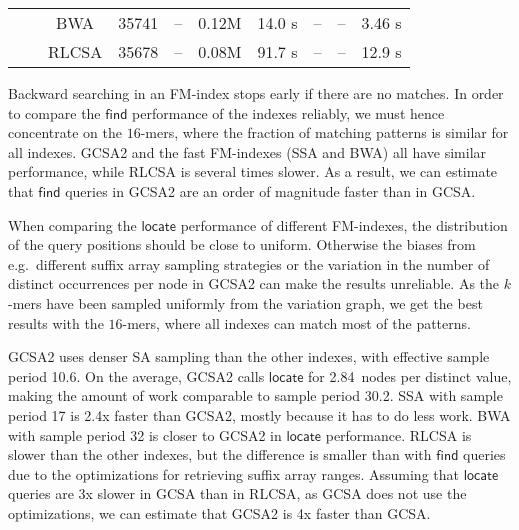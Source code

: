 \documentclass[twoside,leqno,twocolumn]{article}
\newcommand{\find}{\ensuremath{\mathsf{find}}}
\newcommand{\locate}{\ensuremath{\mathsf{locate}}}
\newcommand{\parent}{\ensuremath{\mathsf{parent}}}
\newcommand{\countq}{\ensuremath{\mathsf{count}}}
\newcommand{\kmer}[1]{$#1$\nobreakdash-mer}
\newcommand{\orderk}[1]{order\nobreakdash-$#1$}
\begin{document}
\begin{table*}[t]
\begin{center}
\begin{tabular}{cc|cccc|cccc}
     &        & BWA   &  35741 &    -- & 0.12M & 14.0 \textmu{}s &              -- &              -- & 3.46 \textmu{}s \\
     &        & RLCSA &  35678 &    -- & 0.08M & 91.7 \textmu{}s &              -- &              -- & 12.9 \textmu{}s \\
\hline
\end{tabular}
\caption{Query benchmarks using an \orderk{128} GCSA2 and various FM\nobreakdash-indexes. Pattern length; number of patterns; index type; number matching patterns, matching nodes, and distinct occurrences; average time for $[sp, ep] = \find(X)$, $\parent(sp, ep)$, and $\countq(sp, ep)$ queries in microseconds; and average time per value for $\locate(sp, ep)$ queries in microseconds.}\label{table:benchmark}
\end{center}
\end{table*}

Backward searching in an FM-index stops early if there are no matches. In order to compare the $\find$ performance of the indexes reliably, we must hence concentrate on the \kmer{16}s, where the fraction of matching patterns is similar for all indexes. GCSA2 and the fast FM-indexes (SSA and BWA) all have similar performance, while RLCSA is several times slower. As a result, we can estimate that $\find$ queries in GCSA2 are an order of magnitude faster than in GCSA.

When comparing the $\locate$ performance of different FM-indexes, the distribution of the query positions should be close to uniform. Otherwise the biases from e.g.~different suffix array sampling strategies or the variation in the number of distinct occurrences per node in GCSA2 can make the results unreliable. As the \kmer{k}s have been sampled uniformly from the variation graph, we get the best results with the \kmer{16}s, where all indexes can match most of the patterns.

GCSA2 uses denser SA sampling than the other indexes, with effective sample period 10.6. On the average, GCSA2 calls $\locate$ for 2.84~nodes per distinct value, making the amount of work comparable to sample period 30.2. SSA with sample period 17 is 2.4x faster than GCSA2, mostly because it has to do less work. BWA with sample period 32 is closer to GCSA2 in $\locate$ performance. RLCSA is slower than the other indexes, but the difference is smaller than with $\find$ queries due to the optimizations for retrieving suffix array ranges. Assuming that $\locate$ queries are 3x slower in GCSA than in RLCSA, as GCSA does not use the optimizations, we can estimate that GCSA2 is 4x faster than GCSA.
\end{document}
